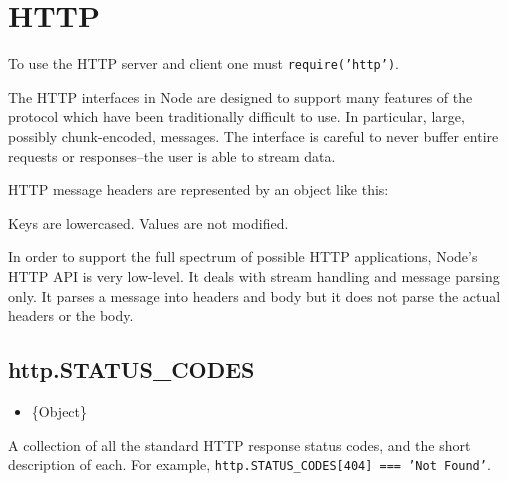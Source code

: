 \section{HTTP}

\begin{Shaded}
\begin{Highlighting}[]
\NormalTok{: } 
\end{Highlighting}
\end{Shaded}

To use the HTTP server and client one must \texttt{require('http')}.

The HTTP interfaces in Node are designed to support many features of the
protocol which have been traditionally difficult to use. In particular,
large, possibly chunk-encoded, messages. The interface is careful to
never buffer entire requests or responses--the user is able to stream
data.

HTTP message headers are represented by an object like this:

\begin{Shaded}
\begin{Highlighting}[]
\NormalTok{\{ }\NormalTok{: }\NormalTok{,}
  \NormalTok{: }\NormalTok{,}
  \NormalTok{: }\NormalTok{,}
  \NormalTok{: } \NormalTok{\}}
\end{Highlighting}
\end{Shaded}

Keys are lowercased. Values are not modified.

In order to support the full spectrum of possible HTTP applications,
Node's HTTP API is very low-level. It deals with stream handling and
message parsing only. It parses a message into headers and body but it
does not parse the actual headers or the body.

\subsection{http.STATUS\_CODES}

\begin{itemize}
\item
  \{Object\}
\end{itemize}

A collection of all the standard HTTP response status codes, and the
short description of each. For example,
\texttt{http.STATUS\_CODES{[}404{]} === 'Not Found'}.

